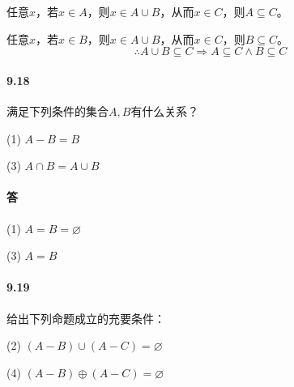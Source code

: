 \documentclass[UTF8]{ctexart}
\begin{document}
任意$x$，若$x \in A$，则$x \in A \cup B$，从而$x \in C$，则$A \subseteq C$。

任意$x$，若$x \in B$，则$x \in A \cup B$，从而$x \in C$，则$B \subseteq C$。
$$\therefore A \cup B\subseteq C \Rightarrow A\subseteq C \land B\subseteq C$$

\paragraph{9.18} \label{9.18}
满足下列条件的集合$A,B$有什么关系？

(1) $A-B=B$

(3) $A \cap B = A \cup B$

\paragraph{答}
(1) $A=B=\varnothing$

(3) $A=B$

\paragraph{9.19} \label{9.19}
给出下列命题成立的充要条件：

(2) $ (A-B) \cup (A-C) = \varnothing $

(4) $ (A-B) \oplus (A-C) = \varnothing $
\end{document}
